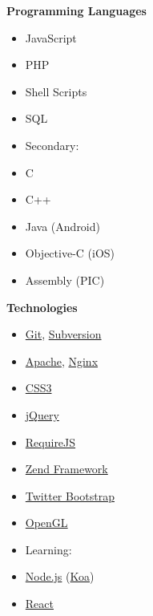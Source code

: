 \noindent
\begin{minipage}[t]{.3\linewidth}
\vspace{0pt}
\textbf{Programming Languages}
\begin{itemize}[itemsep=0pt]    %
    \item JavaScript
    \item PHP
    \item Shell Scripts
    \item SQL
    \item[] \hspace*{-2em} Secondary:
    \item C
    \item C++
    \item Java (Android)
    \item Objective-C (iOS)
    \item Assembly (PIC)
\end{itemize}
\end{minipage}
%
\hfill
%
\begin{minipage}[t]{.25\linewidth}
\vspace{0pt}
\textbf{Technologies}
\begin{itemize}[itemsep=0pt]
    \item \href{http://git-scm.com}{Git}, \href{http://subversion.apache.org}{Subversion}
    \item \href{http://httpd.apache.org}{Apache}, \href{http://nginx.com}{Nginx}
    \item \href{http://w3.org/Style/CSS}{CSS3}
    \item \href{http://jquery.com}{jQuery}
    \item \href{http://requirejs.org}{RequireJS}
    \item \href{http://framework.zend.com}{Zend Framework}
    \item \href{http://getbootstrap.com}{Twitter Bootstrap}
    \item \href{http://opengl.org}{OpenGL}
    \item[] \hspace*{-2em} Learning:
    \item \href{http://nodejs.org}{Node.js} (\href{http://koajs.com}{Koa})
    \item \href{http://facebook.github.io/react}{React}
\end{itemize}
\end{minipage}
%
\hfill

